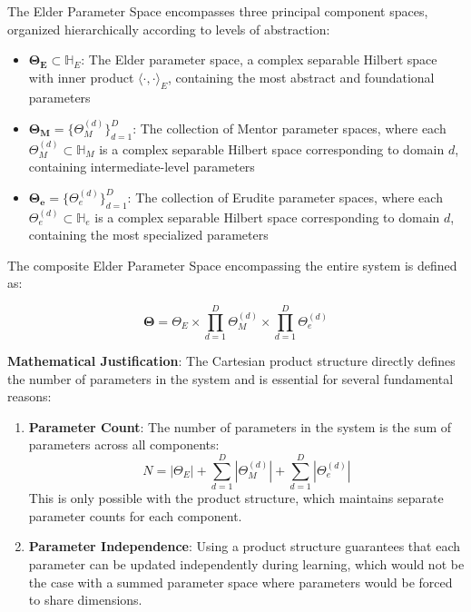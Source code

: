 \begin{definition}
The Elder Parameter Space encompasses three principal component spaces, organized hierarchically according to levels of abstraction:

\begin{itemize}
    \item $\boldsymbol{\Theta_E} \subset \mathbb{H}_E$: The Elder parameter space, a complex separable Hilbert space with inner product $\langle \cdot, \cdot \rangle_E$, containing the most abstract and foundational parameters
    
    \item $\boldsymbol{\Theta_M} = \{\Theta_M^{(d)}\}_{d=1}^D$: The collection of Mentor parameter spaces, where each $\Theta_M^{(d)} \subset \mathbb{H}_M$ is a complex separable Hilbert space corresponding to domain $d$, containing intermediate-level parameters
    
    \item $\boldsymbol{\Theta_e} = \{\Theta_e^{(d)}\}_{d=1}^D$: The collection of Erudite parameter spaces, where each $\Theta_e^{(d)} \subset \mathbb{H}_e$ is a complex separable Hilbert space corresponding to domain $d$, containing the most specialized parameters
\end{itemize}

The composite Elder Parameter Space encompassing the entire system is defined as:

\begin{equation}
\boldsymbol{\Theta} = \Theta_E \times \prod_{d=1}^D \Theta_M^{(d)} \times \prod_{d=1}^D \Theta_e^{(d)}
\end{equation}

\textbf{Mathematical Justification}: The Cartesian product structure directly defines the number of parameters in the system and is essential for several fundamental reasons:
\begin{enumerate}
    \item \textbf{Parameter Count}: The number of parameters in the system is the sum of parameters across all components:
    \begin{equation}
    N = |\Theta_E| + \sum_{d=1}^D |\Theta_M^{(d)}| + \sum_{d=1}^D |\Theta_e^{(d)}|
    \end{equation}
    This is only possible with the product structure, which maintains separate parameter counts for each component.
    
    \item \textbf{Parameter Independence}: Using a product structure guarantees that each parameter can be updated independently during learning, which would not be the case with a summed parameter space where parameters would be forced to share dimensions.
    

\end{enumerate}
\end{definition}
